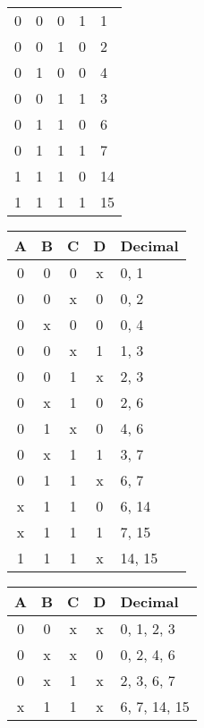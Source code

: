 \documentclass{article}
\begin{document}
\begin{resolution}
\begin{table}[H]
\begin{tabular}{cccc l}
                        0&0&0&1& 1\\
                        0&0&1&0& 2\\
                        0&1&0&0& 4\\\hline
                        0&0&1&1& 3\\
                        0&1&1&0& 6\\\hline
                        0&1&1&1& 7\\
                        1&1&1&0& 14\\\hline
                        1&1&1&1& 15\\\hline
                    \end{tabular}
                    \quad
                    \centering\begin{tabular}{cccc l}
                        A&B&C&D& Decimal\\\hline
                        0&0&0&x& 0, 1\\
                        0&0&x&0& 0, 2\\
                        0&x&0&0& 0, 4\\\hline
                        0&0&x&1& 1, 3\\
                        0&0&1&x& 2, 3\\
                        0&x&1&0& 2, 6\\
                        0&1&x&0& 4, 6\\\hline
                        0&x&1&1& 3, 7\\
                        0&1&1&x& 6, 7\\
                        x&1&1&0& 6, 14\\\hline
                        x&1&1&1& 7, 15\\
                        1&1&1&x& 14, 15\\\hline
                    \end{tabular}
                    \quad
                    \centering\begin{tabular}{cccc l}
                        A&B&C&D& Decimal\\\hline
                        0&0&x&x& 0, 1, 2, 3\\
                        0&x&x&0& 0, 2, 4, 6\\\hline
                        0&x&1&x& 2, 3, 6, 7\\\hline
                        x&1&1&x& 6, 7, 14, 15\\\hline
                    \end{tabular}

\end{table}
\end{resolution}
\end{document}
